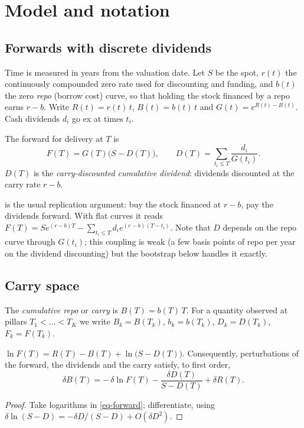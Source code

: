 \section{Model and notation}\label{sec-model}

\subsection{Forwards with discrete dividends}
Time is measured in years from the valuation date. Let $S$ be the spot, $r(t)$ the continuously compounded zero
rate used for discounting and funding, and $b(t)$ the zero \emph{repo} (borrow cost) curve, so that holding the
stock financed by a repo earns $r-b$. Write $R(t)=r(t)\,t$, $B(t)=b(t)\,t$ and $G(t)=e^{R(t)-B(t)}$. Cash
dividends $d_i$ go ex at times $t_i$.

\begin{definition}[Forward]\label{def-forward}
The forward for delivery at $T$ is
\begin{equation}\label{eq-forward}
F(T)=G(T)\bigl(S-D(T)\bigr),\qquad D(T)=\sum_{t_i\le T}\frac{d_i}{G(t_i)}.
\end{equation}
$D(T)$ is the \emph{carry-discounted cumulative dividend}: dividends discounted at the carry rate $r-b$.
\end{definition}

 is the usual replication argument: buy the stock financed at $r-b$, pay the dividends forward.
With flat curves it reads $F(T)=Se^{(r-b)T}-\sum_{t_i\le T}d_ie^{(r-b)(T-t_i)}$. Note that $D$ depends on the repo
curve through $G(t_i)$; this coupling is weak (a few basis points of repo per year on the dividend discounting) but
the bootstrap below handles it exactly.

\subsection{Carry space}
\begin{definition}[Carry]\label{def-carry}
The \emph{cumulative repo} or \emph{carry} is $B(T)=b(T)\,T$. For a quantity observed at pillars $T_1<\dots<T_K$ we
write $B_k=B(T_k)$, $b_k=b(T_k)$, $D_k=D(T_k)$, $F_k=F(T_k)$.
\end{definition}

\begin{lemma}\label{lem-additivity}
$\ln F(T)=R(T)-B(T)+\ln\bigl(S-D(T)\bigr)$. Consequently, perturbations of the forward, the dividends and the carry
satisfy, to first order,
\begin{equation}\label{eq-additivity}
\delta B(T)=-\,\delta\ln F(T)-\frac{\delta D(T)}{S-D(T)}+\delta R(T).
\end{equation}
\end{lemma}
\begin{proof}
Take logarithms in \cref{eq-forward}; differentiate, using $\delta\ln(S-D)=-\delta D/(S-D)+O(\delta D^2)$.
\end{proof}

